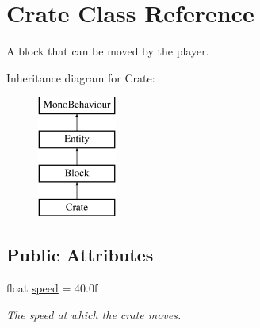 \hypertarget{class_crate}{}\section{Crate Class Reference}
\label{class_crate}


A block that can be moved by the player.  


Inheritance diagram for Crate\+:\begin{figure}[H]
\begin{center}
\leavevmode
\includegraphics[height=4.000000cm]{class_crate}
\end{center}
\end{figure}
\subsection*{Public Attributes}
\begin{DoxyCompactItemize}
\item 
float \mbox{\hyperlink{class_crate_aa8fcf51e527307c91d32173155b53ffb}{speed}} = 40.\+0f
\begin{DoxyCompactList}\small\item\em The speed at which the crate moves. \end{DoxyCompactList}\end{DoxyCompactItemize}
